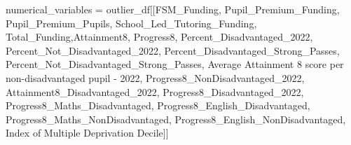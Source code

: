 \documentclass[
  letterpaper,
  DIV=11,
  numbers=noendperiod]{scrartcl}
\newenvironment{Shaded}{\begin{snugshade}}{\end{snugshade}}
\newcommand{\NormalTok}[1]{\textcolor[rgb]{0.00,0.23,0.31}{#1}}
\newcommand{\OperatorTok}[1]{\textcolor[rgb]{0.37,0.37,0.37}{#1}}
\newcommand{\StringTok}[1]{\textcolor[rgb]{0.13,0.47,0.30}{#1}}
\begin{document}
\begin{Shaded}
\begin{Highlighting}[]
\NormalTok{numerical\_variables }\OperatorTok{=}\NormalTok{ outlier\_df[[}\StringTok{\textquotesingle{}FSM\_Funding\textquotesingle{}}\NormalTok{,}
                                                \StringTok{\textquotesingle{}Pupil\_Premium\_Funding\textquotesingle{}}\NormalTok{,}
                                                 \StringTok{\textquotesingle{}Pupil\_Premium\_Pupils\textquotesingle{}}\NormalTok{,}
                                          \StringTok{\textquotesingle{}School\_Led\_Tutoring\_Funding\textquotesingle{}}\NormalTok{,}
                                                        \StringTok{\textquotesingle{}Total\_Funding\textquotesingle{}}\NormalTok{,}\StringTok{\textquotesingle{}Attainment8\textquotesingle{}}\NormalTok{,}
                                                            \StringTok{\textquotesingle{}Progress8\textquotesingle{}}\NormalTok{,}
                                           \StringTok{\textquotesingle{}Percent\_Disadvantaged\_2022\textquotesingle{}}\NormalTok{,}
                                       \StringTok{\textquotesingle{}Percent\_Not\_Disadvantaged\_2022\textquotesingle{}}\NormalTok{,}
                                  \StringTok{\textquotesingle{}Percent\_Disadvantaged\_Strong\_Passes\textquotesingle{}}\NormalTok{,}
                              \StringTok{\textquotesingle{}Percent\_Not\_Disadvantaged\_Strong\_Passes\textquotesingle{}}\NormalTok{,}
       \StringTok{\textquotesingle{}Average Attainment 8 score per non{-}disadvantaged pupil  {-} 2022\textquotesingle{}}\NormalTok{,}
                                      \StringTok{\textquotesingle{}Progress8\_NonDisadvantaged\_2022\textquotesingle{}}\NormalTok{,}
                                   \StringTok{\textquotesingle{}Attainment8\_Disadvantaged\_2022\textquotesingle{}}\NormalTok{,}
                                         \StringTok{\textquotesingle{}Progress8\_Disadvantaged\_2022\textquotesingle{}}\NormalTok{,}
                                        \StringTok{\textquotesingle{}Progress8\_Maths\_Disadvantaged\textquotesingle{}}\NormalTok{,}
                                      \StringTok{\textquotesingle{}Progress8\_English\_Disadvantaged\textquotesingle{}}\NormalTok{,}
                                     \StringTok{\textquotesingle{}Progress8\_Maths\_NonDisadvantaged\textquotesingle{}}\NormalTok{,}
                                   \StringTok{\textquotesingle{}Progress8\_English\_NonDisadvantaged\textquotesingle{}}\NormalTok{, }\StringTok{\textquotesingle{}Index of Multiple Deprivation Decile\textquotesingle{}}\NormalTok{]]}
\end{Highlighting}
\end{Shaded}
\end{document}
